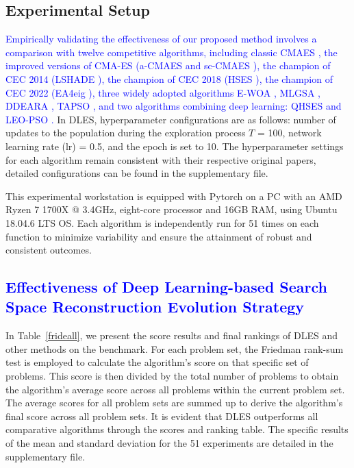 \documentclass[journal,twoside]{IEEEtran}
\begin{document}
\subsection{Experimental Setup}
\textcolor{blue}{
Empirically validating the effectiveness of our proposed method involves a comparison with twelve competitive algorithms, including classic CMAES \cite{hansen2001completely}, the 
improved versions of CMA-ES (a-CMAES and sc-CMAES \cite{gissler2023evaluation}), the champion of CEC 2014 (LSHADE \cite{6557555}), the champion of CEC 2018 (HSES \cite{zhang2018hybrid}), the champion of CEC 2022 (EA4eig \cite{9870433}), three widely adopted algorithms E-WOA \cite{espinoza2023comparison}, MLGSA \cite{9272701}, DDEARA \cite{9733794}, TAPSO \cite{8866749}, and two algorithms combining deep learning: QHSES \cite{10035716} and LEO-PSO \cite{10002945}. } In DLES, hyperparameter configurations are as follows: number of updates to the population during the exploration process $T$ = 100, network learning rate (lr) = 0.5, and the epoch is set to 10. The hyperparameter settings for each algorithm remain consistent with their respective original papers, detailed configurations can be found in the supplementary file.

This experimental workstation is equipped with Pytorch on a PC with an AMD Ryzen 7 1700X @ 3.4GHz, eight-core processor and 16GB RAM, using Ubuntu 18.04.6
LTS OS. Each algorithm is independently run for 51 times on each function to minimize variability and ensure the attainment of robust and consistent outcomes.

\textcolor{blue}{
\subsection{Effectiveness of Deep Learning-based Search Space Reconstruction Evolution Strategy}}
In Table~\ref{frideall}, we present the score results and final rankings of DLES and other methods on the benchmark. For each problem set, the Friedman rank-sum test is employed to calculate the algorithm's score on that specific set of problems. This score is then divided by the total number of problems to obtain the algorithm's average score across all problems within the current problem set. The average scores for all problem sets are summed up to derive the algorithm's final score across all problem sets. It is evident that DLES outperforms all comparative algorithms through the scores and ranking table. The specific results of the mean and standard deviation for the 51 experiments are detailed in the supplementary file.
\end{document}

